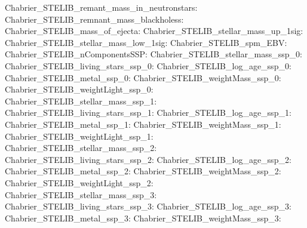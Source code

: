 Chabrier\_STELIB\_remant\_mass\_in\_neutronstars:  \newline 
Chabrier\_STELIB\_remnant\_mass\_blackholess:  \newline 
Chabrier\_STELIB\_mass\_of\_ejecta:  \newline 
Chabrier\_STELIB\_stellar\_mass\_up\_1sig:  \newline 
Chabrier\_STELIB\_stellar\_mass\_low\_1sig:  \newline 
Chabrier\_STELIB\_spm\_EBV:  \newline 
Chabrier\_STELIB\_nComponentsSSP:  \newline 
Chabrier\_STELIB\_stellar\_mass\_ssp\_0:  \newline 
Chabrier\_STELIB\_living\_stars\_ssp\_0:  \newline 
Chabrier\_STELIB\_log\_age\_ssp\_0:  \newline 
Chabrier\_STELIB\_metal\_ssp\_0:  \newline 
Chabrier\_STELIB\_weightMass\_ssp\_0:  \newline 
Chabrier\_STELIB\_weightLight\_ssp\_0:  \newline 
Chabrier\_STELIB\_stellar\_mass\_ssp\_1:  \newline 
Chabrier\_STELIB\_living\_stars\_ssp\_1:  \newline 
Chabrier\_STELIB\_log\_age\_ssp\_1:  \newline 
Chabrier\_STELIB\_metal\_ssp\_1:  \newline 
Chabrier\_STELIB\_weightMass\_ssp\_1:  \newline 
Chabrier\_STELIB\_weightLight\_ssp\_1:  \newline 
Chabrier\_STELIB\_stellar\_mass\_ssp\_2:  \newline 
Chabrier\_STELIB\_living\_stars\_ssp\_2:  \newline 
Chabrier\_STELIB\_log\_age\_ssp\_2:  \newline 
Chabrier\_STELIB\_metal\_ssp\_2:  \newline 
Chabrier\_STELIB\_weightMass\_ssp\_2:  \newline 
Chabrier\_STELIB\_weightLight\_ssp\_2:  \newline 
Chabrier\_STELIB\_stellar\_mass\_ssp\_3:  \newline 
Chabrier\_STELIB\_living\_stars\_ssp\_3:  \newline 
Chabrier\_STELIB\_log\_age\_ssp\_3:  \newline 
Chabrier\_STELIB\_metal\_ssp\_3:  \newline 
Chabrier\_STELIB\_weightMass\_ssp\_3:  \newline 
